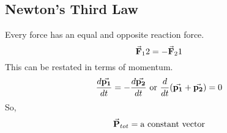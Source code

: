 \subsection*{Newton's Third Law}
Every force has an equal and opposite reaction force.
\begin{equation}
    \va{F}_12 = -\va{F}_21
\end{equation}
This can be restated in terms of momentum.
\begin{equation}
    \frac{d\va{p_1}}{dt} = -\frac{d\va{p_2}}{dt} \text{ or } \frac{d}{dt} (\va{p_1} + \va{p_2}) = 0
\end{equation}
So,
\begin{equation}
    \va{P}_{tot} = \text{a constant vector}
\end{equation}